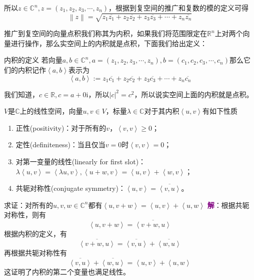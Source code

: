 所以$z\in \mathbb{C}^n,z=(z_1,z_2,z_3,\cdots,z_n)$，根据到复空间的推广和复数的模的定义可得$$\left \| z \right \| =\sqrt{z_1\overline{z_1}+z_2\overline{z_2}+z_3\overline{z_3}+\cdots+z_n\overline{z_n}}$$

推广到复空间的向量点积我们称其为内积，如果我们将范围限定在$\mathbb{R}^n$上对两个向量进行操作，那么实空间上的内积就是点积，下面我们给出定义：

\begin{definition}{内积的定义}
	若向量$a,b\in \mathbb{C}^n,a=(z_1,z_2,z_3,\cdots,z_n),b=(c_1,c_2,c_3,\cdots,c_n)$那么它们的内积记作$\left \langle a , b \right \rangle $表示为$$\left \langle a , b \right \rangle :=z_1\overline{c_1}+z_2\overline{c_2}+z_3\overline{c_3}+\cdots+z_n\overline{c_n}$$
\end{definition}

我们知道，$c\in \mathbb{R},c=a+0\mathrm{i}$，所以$\left| c \right|^2=c^2$，所以说实空间上面的内积就是点积。

\begin{corollary}
	\label{cor:innerProduct}
	$V$是$\mathbb{C}$上的线性空间，向量$u,v\in V$，标量$\lambda \in \mathbb{C}$对于其内积$\left \langle u,v \right \rangle $有如下性质
	\begin{enumerate}
		\item 正性(positivity)：对于所有的$v$，$\left \langle v,v \right \rangle\ge 0 $；
		\item 定性(definiteness)：当且仅当$v=0$时$\left \langle v,v \right \rangle= 0 $；
		\item 对第一变量的线性(linearly for first slot)：$\lambda \left \langle u,v \right \rangle=\left \langle \lambda u,v \right \rangle,\left \langle u+w,v \right \rangle=\left \langle u,v \right \rangle+\left \langle w,v \right \rangle$；
		\item 共轭对称性(conjugate symmetry)：$\left \langle u,v \right \rangle= \overline{\left \langle v,u \right \rangle} $。
	\end{enumerate}
\end{corollary}

\begin{example}
	求证：对所有的$u,v,w \in \mathbb{C}^n$都有$\left \langle u,v+w \right \rangle =\left \langle u,v \right \rangle +\left \langle u,w \right \rangle $
	\tcblower
	\textcolor{purple}{\textbf{解}}：根据共轭对称性，则有$$\left \langle u,v+w \right \rangle =\overline{\left \langle v+w,u \right \rangle } $$根据内积的定义，有$$\overline{\left \langle v+w,u \right \rangle } =\overline{\left \langle v,u \right \rangle } +\overline{\left \langle w,u \right \rangle }$$再根据共轭对称性有$$\overline{\left \langle v,u \right \rangle } +\overline{\left \langle w,u \right \rangle }=\left \langle u,v \right \rangle +\left \langle u,w \right \rangle $$这证明了内积的第二个变量也满足线性。
\end{example}

